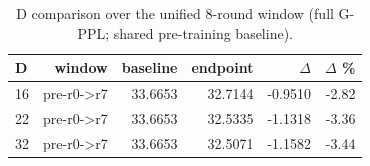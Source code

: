 \begin{table}[t]
\centering
\caption{D comparison over the unified 8-round window (full G-PPL; shared pre-training baseline).}
\label{tab:opt-d}
\begin{tabular}{lrrrrr}
\toprule
D & window & baseline & endpoint & $\Delta$ & $\Delta$ \% \\
\midrule
16 & pre-r0->r7 & 33.6653 & 32.7144 & -0.9510 & -2.82 \\
22 & pre-r0->r7 & 33.6653 & 32.5335 & -1.1318 & -3.36 \\
32 & pre-r0->r7 & 33.6653 & 32.5071 & -1.1582 & -3.44 \\
\bottomrule
\end{tabular}
\end{table}
